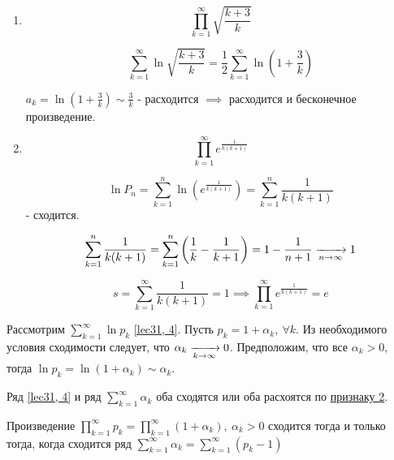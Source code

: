 \documentclass[../../main.tex]{subfiles}
\begin{document}
	\begin{example}
		\begin{enumerate}[label=\arabic*)]
			\item \[\prod\limits_{k = 1}^{\infty} \sqrt{\frac{k + 3}{k}}\]
			
			\[\sum\limits_{k = 1}^{\infty} \ln \sqrt{\frac{k + 3}{k}} = \frac{1}{2} 
			\sum\limits_{k = 1}^{\infty} \ln\left(1 + \frac{3}{k}\right) \]
			
			$a_k = \ln \left(1 + \frac{3}{k}\right) \sim \frac{3}{k}$ - расходится 
			$\implies$ расходится и бесконечное произведение.
			
			\item \[\prod\limits_{k = 1}^{\infty} e^{\frac{1}{k(k + 1)}} \]
			
			\[\ln P_n = \sum\limits_{k = 1}^{n} \ln \left(e^{\frac{1}{k(k + 1)}}\right) 
			= \sum\limits_{k = 1}^{n} \frac{1}{k(k + 1)}\] - сходится.
			
			\[\sum\limits_{k = 1}^{n} \frac{1}{k(k + 1)} = \sum\limits_{k = 1}^{n} 
			\left(\frac{1}{k} - \frac{1}{k + 1} \right) = 1 - \frac{1}{n + 1} \xrightarrow[n 
			\to \infty]{} 1 \]
			
			\[s = \sum\limits_{k = 1}^{\infty} \frac{1}{k(k + 1)} = 1 \implies 
			\prod\limits_{k = 1}^{\infty} e^{\frac{1}{k(k + 1)}} = e\]
		\end{enumerate}
	\end{example}

	Рассмотрим $\sum\limits_{k = 1}^{\infty} \ln p_k$ \eqref{lec31, 4}. Пусть 
	$p_k = 1 + \alpha_k,\ \forall k$. Из необходимого условия сходимости следует, 
	что $\alpha_k \xrightarrow[k \to \infty]{} 0$. Предположим, что все $\alpha_k > 0$, 
	тогда $\ln p_k = \ln (1 + \alpha_k) \sim \alpha_k$.
	
	Ряд \eqref{lec31, 4} и ряд $\sum\limits_{k = 1}^{\infty} \alpha_k$ оба 
	сходятся или оба расхоятся по \hyperref[lec26:comp_test_2]{признаку 
	2\textdegree}.
	
	\begin{thm}\label{lec31:thm2} 
		Произведение $\prod\limits_{k = 1}^{\infty} p_k = \prod\limits_{k = 
		1}^{\infty}(1 + \alpha_k),\ \alpha_k > 0$ сходится тогда и только тогда, 
		когда сходится ряд $\sum\limits_{k = 1}^{\infty} \alpha_k = \sum\limits_{k = 
		1}^{\infty} (p_k - 1)$
	\end{thm}		
\end{document}
